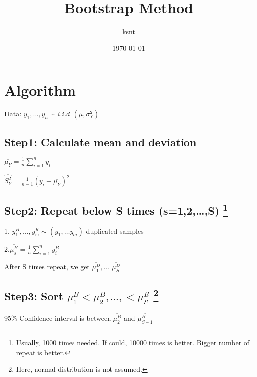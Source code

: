 \documentclass[twocolumn,10pt]{article}
\begin{document}
\title{Bootstrap Method}
\author{ksnt}
\date{\today}

\maketitle

\section{Algorithm}

Data: $y_1, \dots , y_n \sim i.i.d ~~ (\mu,\sigma_{Y}^2)$ 

\subsection*{Step1:  Calculate mean and deviation} \par 

$ \overline{\mu_{Y}} = \frac{1}{n} \sum_{i=1}^{n} y_i $

\par

$\widehat{S_{Y}^2} = \frac{1}{n-1} (y_i - \overline{\mu_{Y}})^2$
 
\subsection*{Step2: Repeat below S times (s=1,2,\dots,S) \footnote{Usually, 1000 times needed. If could, 10000 times is better. Bigger number of repeat is better.}} \par 

1. $y_{1}^B, \dots, y_m^{B} \sim (y_1, \dots y_m)$   duplicated samples

2.$ \overline{\mu^{B}_{s}} = \frac{1}{n} \sum_{i=1}^{n} y^{B}_i$

After S times repeat, we get $ \overline{\mu^{B}_{1}}, \dots, \overline{\mu^{B}_{S}} $

\subsection*{Step3: Sort $ \overline{\mu^{B}_{1}} < \overline{\mu^{B}_{2}}, \dots, < \overline{\mu^{B}_{S}}$  \footnote{Here, normal distribution is not assumed.} }

95\% Confidence interval is between $\overline{\mu^{B}_{2}}$ and $\overline{\mu^{B}_{S-1}}$
\end{document}
